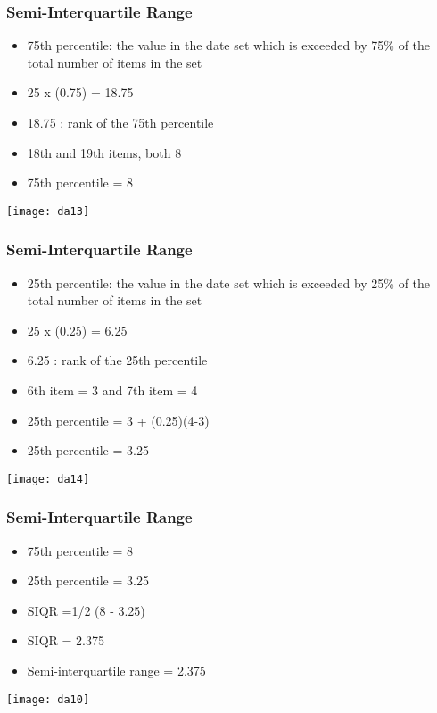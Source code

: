 \begin{frame}[fragile]\frametitle{Semi-Interquartile Range}	
\begin{itemize}
\item 75th percentile: the value in the date set which is exceeded by 75\% of the total number of items in the set
\item 25 x (0.75) = 18.75
\item 18.75 : rank of the 75th percentile
\item 18th  and 19th items, both  8
\item 75th percentile = 8
\end{itemize}
\begin{center}
\texttt{[image: da13]}
\end{center}
\end{frame}


\begin{frame}[fragile]\frametitle{Semi-Interquartile Range}	
\begin{itemize}
\item 25th percentile: the value in the date set which is exceeded by 25\% of the total number of items in the set
\item 25 x (0.25) = 6.25
\item 6.25 : rank of the 25th percentile
\item 6th item = 3 and 7th item = 4
\item 25th percentile = 3 + (0.25)(4-3)
\item 25th percentile = 3.25
\end{itemize}
\begin{center}
\texttt{[image: da14]}
\end{center}
\end{frame}


\begin{frame}[fragile]\frametitle{Semi-Interquartile Range}	
\begin{itemize}
\item 75th percentile = 8
\item 25th percentile = 3.25
\item SIQR =1/2 (8 - 3.25)
\item SIQR = 2.375
\item Semi-interquartile range = 2.375
\end{itemize}

\begin{center}
\texttt{[image: da10]}
\end{center}
\end{frame}



